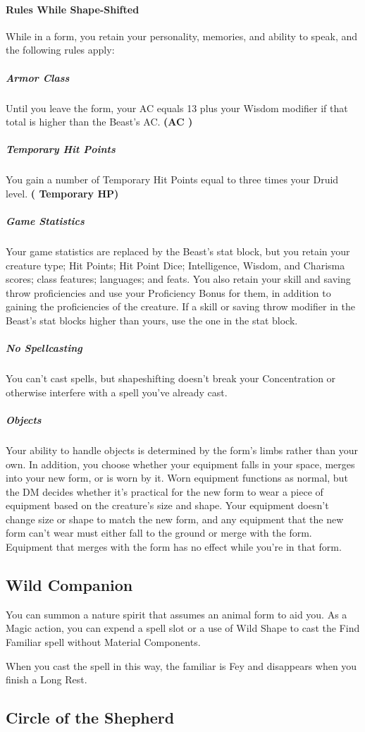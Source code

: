\documentclass[letterpaper,openany,oneside,twocolumn]{book}
\begin{document}
\paragraph*{Rules While Shape-Shifted} While in a form, you retain your personality, memories, and ability to speak, and the following rules apply:
\subparagraph*{Armor Class} Until you leave the form, your AC equals 13 plus your Wisdom modifier if that total is higher than the Beast's AC. \textbf{(AC )}
\subparagraph*{Temporary Hit Points} You gain a number of Temporary Hit Points equal to three times your Druid level. \textbf{( Temporary HP)}
\subparagraph*{Game Statistics} Your game statistics are replaced by the Beast's stat block, but you retain your creature type; Hit Points; Hit Point Dice; Intelligence, Wisdom, and Charisma scores; class features; languages; and feats. You also retain your skill and saving throw proficiencies and use your Proficiency Bonus for them, in addition to gaining the proficiencies of the creature. If a skill or saving throw modifier in the Beast's stat blocks higher than yours, use the one in the stat block.
\subparagraph*{No Spellcasting} You can't cast spells, but shapeshifting doesn't break your Concentration or otherwise interfere with a spell you've already cast.
\subparagraph*{Objects} Your ability to handle objects is determined by the form's limbs rather than your own. In addition, you choose whether your equipment falls in your space, merges into your new form, or is worn by it. Worn equipment functions as normal, but the DM decides whether it's practical for the new form to wear a piece of equipment based on the creature's size and shape. Your equipment doesn't change size or shape to match the new form, and any equipment that the new form can't wear must either fall to the ground or merge with the form. Equipment that merges with the form has no effect while you're in that form.
\subsection*{Wild Companion}
You can summon a nature spirit that assumes an animal form to aid you. As a Magic action, you can expend a spell slot or a use of Wild Shape to cast the Find Familiar spell without Material Components.

When you cast the spell in this way, the familiar is Fey and disappears when you finish a Long Rest.
\subsection*{Circle of the Shepherd}
\end{document}
